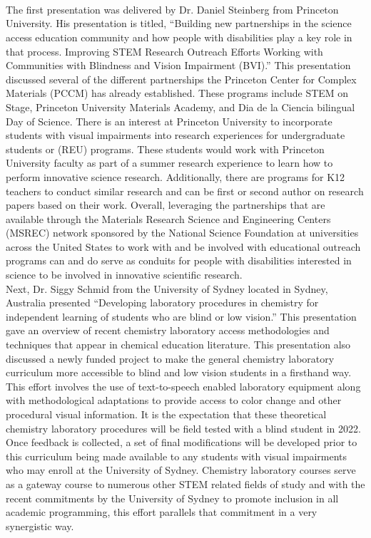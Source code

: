 \documentclass[11pt]{sig-alternate}
\begin{document}
\section*{\vspace{140mm}}
\large
\vspace{2.5 mm}\\
{The first presentation was delivered by Dr. Daniel Steinberg from Princeton University. His presentation is titled, “Building new partnerships in the science access education community and how people with disabilities play a key role in that process. Improving STEM Research Outreach Efforts Working with Communities with Blindness and Vision Impairment (BVI).” This presentation discussed several of the different partnerships the Princeton Center for Complex Materials (PCCM) has already established. These programs include STEM on Stage, Princeton University Materials Academy, and Dia de la Ciencia bilingual Day of Science. There is an interest at Princeton University to incorporate students with visual impairments into research experiences for undergraduate students or (REU) programs. These students would work with Princeton University faculty as part of a summer research experience to learn how to perform innovative science research. Additionally, there are programs for K12 teachers to conduct similar research and can be first or second author on research papers based on their work. Overall, leveraging the partnerships that are available through the Materials Research Science and Engineering Centers (MSREC) network sponsored by the National Science Foundation at universities across the United States to work with and be involved with educational outreach programs can and do serve as conduits for people with disabilities interested in science to be involved in innovative scientific research.}
\vspace{2.5 mm}\\Next, Dr. Siggy Schmid from the University of Sydney located in Sydney, Australia presented “Developing laboratory procedures in chemistry for independent learning of students who are blind or low vision.” This presentation gave an overview of recent chemistry laboratory access methodologies and techniques that appear in chemical education literature. This presentation also discussed a newly funded project to make the general chemistry laboratory curriculum more accessible to blind and low vision students in a firsthand way. This effort involves the use of text-to-speech enabled laboratory equipment along with methodological adaptations to provide access to color change and other procedural visual information. It is the expectation that these theoretical chemistry laboratory procedures will be field tested with a blind student in 2022. Once feedback is collected, a set of final modifications will be developed prior to this curriculum being made available to any students with visual impairments who may enroll at the University of Sydney. Chemistry laboratory courses serve as a gateway course to numerous other STEM related fields of study and with the recent commitments by the University of Sydney to promote inclusion in all academic programming, this effort parallels that commitment in a very synergistic way.
\end{document}
